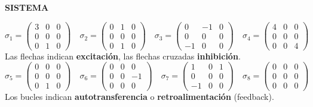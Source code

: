 \newpage
\fancyhf{}
\fancyhead[r]{\thepage} 
\begin{center}
{\fontsize{13}{16}\selectfont \textbf{SISTEMA}}
\end{center}
\vspace{0.5cm}

{\fontsize{13}{15}\selectfont
$$ \sigma_1 = \begin{pmatrix}
3 & 0 & 0 \\
0 & 0 & 0 \\
0 & 1 & 0 
\end{pmatrix} \quad
\sigma_2 = \begin{pmatrix}
0 & 1 & 0 \\
0 & 0 & 0 \\
0 & 1 & 0 
\end{pmatrix} \quad
\sigma_3 = \begin{pmatrix}
0 & -1 & 0 \\
0 & 0 & 0 \\
-1 & 0 & 0 
\end{pmatrix} \quad
\sigma_4 = \begin{pmatrix}
4 & 0 & 0 \\
0 & 0 & 0 \\
0 & 0 & 4 
\end{pmatrix} $$
Las flechas indican \textbf{excitación}, las flechas cruzadas \textbf{inhibición}.
$$ \sigma_5 = \begin{pmatrix}
0 & 0 & 0 \\
0 & 0 & 0 \\
0 & 1 & 0 
\end{pmatrix} \quad
\sigma_6 = \begin{pmatrix}
0 & 0 & 0 \\
0 & 0 & -1 \\
0 & 0 & 0 
\end{pmatrix} \quad
\sigma_7 = \begin{pmatrix}
1 & 0 & 1 \\
0 & 0 & 0 \\
-1 & 0 & 0 
\end{pmatrix} \quad
\sigma_8 = \begin{pmatrix}
0 & 0 & 0 \\
0 & 0 & 0 \\
0 & 0 & 0 
\end{pmatrix} $$
Los bucles indican \textbf{autotransferencia} o \textbf{retroalimentación} (feedback).

}

